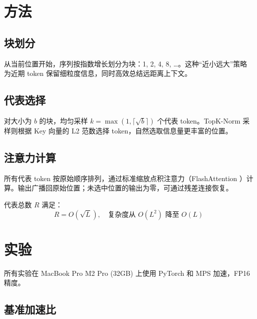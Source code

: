 \documentclass[11pt,a4paper,fontset=mac]{ctexart}
\begin{document}
\section{方法}
\label{sec:method}

\subsection{块划分}

从当前位置开始，序列按指数增长划分为块：1, 2, 4, 8, \ldots。这种``近小远大''策略为近期 token 保留细粒度信息，同时高效总结远距离上下文。

\subsection{代表选择}

对大小为 $b$ 的块，均匀采样 $k = \max(1, \lceil\sqrt{b}\rceil)$ 个代表 token。TopK-Norm 采样则根据 Key 向量的 L2 范数选择 token，自然选取信息量更丰富的位置。

\subsection{注意力计算}

所有代表 token 按原始顺序排列，通过标准缩放点积注意力（FlashAttention \cite{dao2022flashattention}）计算。输出广播回原始位置；未选中位置的输出为零，可通过残差连接恢复。

代表总数 $R$ 满足：
\begin{equation}
R = O(\sqrt{L}), \quad \text{复杂度从 } O(L^2) \text{ 降至 } O(L)
\label{eq:complexity}
\end{equation}

\section{实验}
\label{sec:experiments}

所有实验在 MacBook Pro M2 Pro (32GB) 上使用 PyTorch 和 MPS 加速，FP16 精度。

\subsection{基准加速比}
\end{document}
